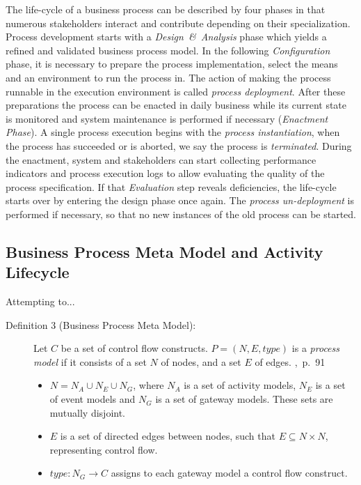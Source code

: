 \noindent
The life-cycle of a business process can be described by four phases in that numerous stakeholders interact and contribute depending on their specialization.
Process development starts with a \emph{Design~\&~Analysis} phase which yields a refined and validated business process model.
In the following \emph{Configuration} phase, it is necessary to prepare the process implementation, select the means and an environment to run the process in.
The action of making the process runnable in the execution environment is called \emph{process deployment}.
After these preparations the process can be enacted in daily business while its current state is monitored and system maintenance is performed if necessary (\emph{Enactment Phase}). 
A single process execution begins with the \emph{process instantiation}, when the process has succeeded or is aborted, we say the process is \emph{terminated}.
During the enactment, system and stakeholders can start collecting performance indicators and process execution logs to allow evaluating the quality of the process specification. If that \emph{Evaluation} step reveals deficiencies, the life-cycle starts over by entering the design phase once again.
The \emph{process un-deployment} is performed if necessary, so that no new instances of the old process can be started.
\cite[p.~11~ff.]{weske:bpm-book}

\subsection{Business Process Meta Model and Activity Lifecycle}\label{ch:bg:bpmetamodel}
Attempting to...

\begin{description}
	\item[Definition 3 (Business Process Meta Model):]
	Let $C$ be a set of control flow constructs. $P = (N,E,type)$ is a \textit{process model} if it consists of a set $N$ of nodes, and a set $E$ of edges. \cite{weske:bpm-book},~p.~91
	\begin{itemize} 
		\item
		$N = N_{A}\cup N_{E}\cup N_{G}$, where $N_{A}$ is a set of activity models, $N_{E}$ is a set of event models and $N_{G}$ is a set of gateway models. These sets are mutually disjoint.
		\item 
		$E$ is a set of directed edges between nodes, such that $E\subseteq N \times N$, representing control flow.
		\item
		$type:N_{G}\rightarrow C$ assigns to each gateway model a control flow construct.
	\end{itemize}
\end{description}

